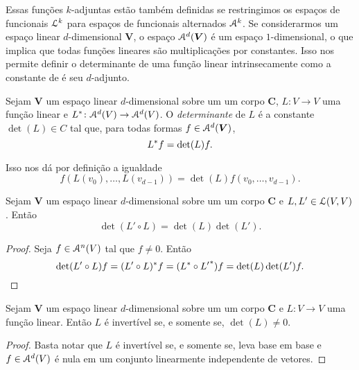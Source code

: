 Essas funções $k$-adjuntas estão também definidas se restringimos os espaços de funcionais $\mathcal{L}^k$ para espaços de funcionais alternados $\mathcal{A}^k$. Se considerarmos um espaço linear $d$-dimensional $\bm V$, o espaço $\mathcal{A}^d(\bm V)$ é um espaço $1$-dimensional, o que implica que todas funções lineares são multiplicações por constantes. Isso nos permite definir o determinante de uma função linear intrinsecamente como a constante de é seu $d$-adjunto.

\begin{definition}
Sejam $\bm V$ um espaço linear $d$-dimensional sobre um um corpo $\bm C$, $L\colon V \to V$ uma função linear e $L^*\colon \mathcal{A}^d(V) \to \mathcal{A}^d(V)$. O \emph{determinante} de $L$ é a constante $\det(L) \in C$ tal que, para todas formas $f \in \mathcal{A}^d(\bm V)$,
	\begin{equation*}
	L^* f = \det(L) f.
	\end{equation*}
\end{definition}

Isso nos dá por definição a igualdade
	\begin{equation*}
	f(L(v_0),\ldots,L(v_{d-1})) = \det(L)f(v_0,\ldots,v_{d-1}).
	\end{equation*}

\begin{proposition}
Sejam $\bm V$ um espaço linear $d$-dimensional sobre um um corpo $\bm C$ e $L,L' \in \mathcal{L}(V,V)$. Então
	\begin{equation*}
	\det(L' \circ L) = \det(L)\det(L').
	\end{equation*}
\end{proposition}
\begin{proof}
Seja $f \in \mathcal{A}^n(V)$ tal que $f \neq 0$. Então
	\begin{equation*}
	\det(L' \circ L)f = (L' \circ L)^* f = ({L}^* \circ {L'}^*) f = \det(L)\det(L') f.
	\end{equation*}
\end{proof}

\begin{proposition}
Sejam $\bm V$ um espaço linear $d$-dimensional sobre um um corpo $\bm C$ e $L\colon V \to V$ uma função linear. Então $L$ é invertível se, e somente se, $\det(L) \neq 0$.
\end{proposition}
\begin{proof}
Basta notar que $L$ é invertível se, e somente se, leva base em base e $f \in \mathcal{A}^d(V)$ é nula em um conjunto linearmente independente de vetores.
\end{proof}







